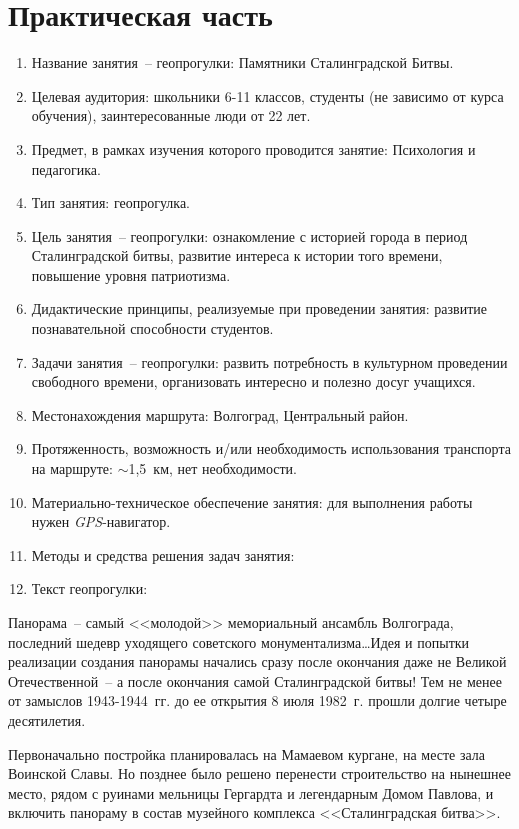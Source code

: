 \section*{Практическая часть}
\begin{enumerate}
  \item Название занятия~-- геопрогулки: Памятники Сталинградской Битвы.
  \item Целевая аудитория: школьники 6-11 классов, студенты (не зависимо от
    курса обучения), заинтересованные люди от 22 лет.
  \item Предмет, в рамках изучения которого проводится занятие: Психология и
    педагогика.
  \item Тип занятия: геопрогулка.
  \item Цель занятия~-- геопрогулки: ознакомление с историей города в период
    Сталинградской битвы, развитие интереса к истории того времени, повышение
    уровня патриотизма.
  \item Дидактические принципы, реализуемые при проведении занятия: развитие
    познавательной способности студентов.
  \item Задачи занятия~-- геопрогулки: развить потребность в культурном
    проведении свободного времени, организовать интересно и полезно досуг
    учащихся.
  \item Местонахождения маршрута: Волгоград, Центральный район.
  \item Протяженность, возможность и/или необходимость использования транспорта
    на маршруте: \( \sim \)1,5~км, нет необходимости.
  \item Материально-техническое обеспечение занятия: для выполнения работы нужен
    \emph{GPS}-навигатор.
  \item Методы и средства решения задач занятия: 
  \item Текст геопрогулки:
\end{enumerate}
  
Панорама~-- самый <<молодой>> мемориальный ансамбль Волгограда, последний
шедевр уходящего советского монументализма\ldots Идея и попытки реализации
создания панорамы начались сразу после окончания даже не Великой
Отечественной~-- а после окончания самой Сталинградской битвы! Тем не менее от
замыслов 1943-1944~гг. до ее открытия 8 июля 1982~г. прошли долгие четыре
десятилетия.

Первоначально постройка планировалась на Мамаевом кургане, на месте зала
Воинской Славы. Но позднее было решено перенести строительство на нынешнее
место, рядом с руинами мельницы Гергардта и легендарным Домом Павлова, и
включить панораму в состав музейного комплекса <<Сталинградская битва>>.

